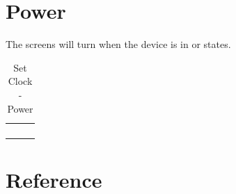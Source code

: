 
\section{Power}

The screens will turn  when the device is in  or 
states.

\begin{table}[H]
\begin{tabu}{ X[1,c,m] | X[1,c,m] | X[1,c,m] }
  \thrule
   &  &  \\ \mrule

   & 
    &  \\ 
   & & \\

  \bhrule
\end{tabu}
\caption {Set Clock - Power}
\end{table}

\section{Reference} \label{Set Clock - Reference}

